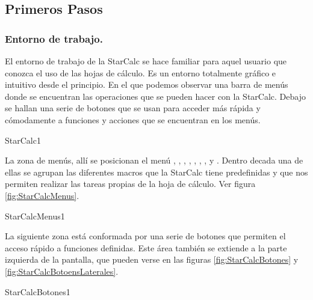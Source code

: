 
\subsection{Primeros Pasos}

\subsubsection{Entorno de trabajo.}

El entorno de trabajo de la StarCalc se hace familiar para aquel
usuario que conozca el uso de las hojas de cálculo. Es un entorno
totalmente gráfico e intuitivo desde el principio. En el que podemos
observar una barra de menús donde se encuentran las operaciones que se
pueden hacer con la StarCalc. Debajo se hallan una serie de botones
que se usan para acceder más rápida y cómodamente a funciones y
acciones que se encuentran en los menús.\\

\begin{figura}{StarCalc}{1}
\caption{La hoja de cálculo StarCalc}
\end{figura}


La zona de menús, allí se posicionan el menú ,
, , , ,
, ,  y .
Dentro decada una  de ellas se agrupan las diferentes macros que la StarCalc
tiene predefinidas y que nos permiten realizar las tareas propias
de la hoja de cálculo. Ver figura \ref{fig:StarCalcMenus}.

\begin{figura}{StarCalcMenus}{1}
\caption{Los menús de la StarCalc}
\label{fig:StarCalcMenus}
\end{figura}


La siguiente zona está conformada por una serie de botones que permiten el
acceso  rápido a funciones definidas. Este área también se extiende a la parte
izquierda de  la pantalla, que pueden verse en las figuras
\ref{fig:StarCalcBotones} y \ref{fig:StarCalcBotoensLaterales}.

\begin{figura}{StarCalcBotones}{1}
\caption{Barra de botones superiores}
\label{fig:StarCalcBotones}
\end{figura}

